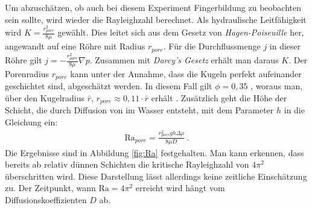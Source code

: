 Um abzuschätzen, ob auch bei diesem Experiment Fingerbildung zu beobachten sein sollte, wird wieder die Rayleighzahl berechnet. Als hydraulische Leitfähigkeit wird $K = \frac{r_{pore}^2}{8\mu}$ gewählt. Dies leitet sich aus dem Gesetz von \textit{Hagen-Poiseuille} her, angewandt auf eine Röhre mit Radius $r_{pore}$. Für die Durchflussmenge $j$ in dieser Röhre gilt $j = -\frac{r_{pore}^2}{8\mu} \nabla p$. Zusammen mit \textit{Darcy's Gesetz} erhält man daraus $K$. 
Der Porenradius $r_{pore}$ kann unter der Annahme, dass die Kugeln perfekt aufeinander geschichtet sind, abgeschätzt werden. In diesem Fall gilt $\phi=0,35$ \citep{song}, woraus man, über den Kugelradius $\bar{r}$, $r_{pore} \approx 0,11 \cdot \bar{r}$ erhält \citep{roth2005}. Zusätzlich geht die Höhe der Schicht, die durch Diffusion von \COT im Wasser entsteht, mit dem Parameter $h$ in die Gleichung ein:
\begin{align}
 \mathrm{Ra}_{pore} = \frac{r_{pore}^2 g h \Delta \rho}{8 \mu D} \; .
 \label{eq:Ra2}
\end{align}
Die Ergebnisse sind in Abbildung \ref{fig:Ra} festgehalten. Man kann erkennen, dass bereits ab relativ dünnen Schichten die kritische Rayleighzahl von $4\pi^2$ überschritten wird. Diese Darstellung lässt allerdings keine zeitliche Einschätzung zu. Der Zeitpunkt, wann $\mathrm{Ra} = 4\pi^2$ erreicht wird hängt vom Diffusionskoeffizienten $D$ ab.